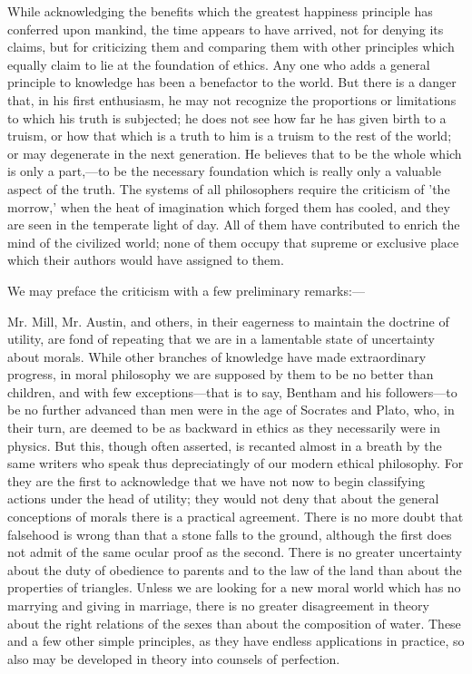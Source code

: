 \documentclass[11pt,letter]{article}
\begin{document}
\par  While acknowledging the benefits which the greatest happiness principle has conferred upon mankind, the time appears to have arrived, not for denying its claims, but for criticizing them and comparing them with other principles which equally claim to lie at the foundation of ethics. Any one who adds a general principle to knowledge has been a benefactor to the world. But there is a danger that, in his first enthusiasm, he may not recognize the proportions or limitations to which his truth is subjected; he does not see how far he has given birth to a truism, or how that which is a truth to him is a truism to the rest of the world; or may degenerate in the next generation. He believes that to be the whole which is only a part,—to be the necessary foundation which is really only a valuable aspect of the truth. The systems of all philosophers require the criticism of 'the morrow,' when the heat of imagination which forged them has cooled, and they are seen in the temperate light of day. All of them have contributed to enrich the mind of the civilized world; none of them occupy that supreme or exclusive place which their authors would have assigned to them.

\par  We may preface the criticism with a few preliminary remarks:—

\par  Mr. Mill, Mr. Austin, and others, in their eagerness to maintain the doctrine of utility, are fond of repeating that we are in a lamentable state of uncertainty about morals. While other branches of knowledge have made extraordinary progress, in moral philosophy we are supposed by them to be no better than children, and with few exceptions—that is to say, Bentham and his followers—to be no further advanced than men were in the age of Socrates and Plato, who, in their turn, are deemed to be as backward in ethics as they necessarily were in physics. But this, though often asserted, is recanted almost in a breath by the same writers who speak thus depreciatingly of our modern ethical philosophy. For they are the first to acknowledge that we have not now to begin classifying actions under the head of utility; they would not deny that about the general conceptions of morals there is a practical agreement. There is no more doubt that falsehood is wrong than that a stone falls to the ground, although the first does not admit of the same ocular proof as the second. There is no greater uncertainty about the duty of obedience to parents and to the law of the land than about the properties of triangles. Unless we are looking for a new moral world which has no marrying and giving in marriage, there is no greater disagreement in theory about the right relations of the sexes than about the composition of water. These and a few other simple principles, as they have endless applications in practice, so also may be developed in theory into counsels of perfection.
\end{document}
